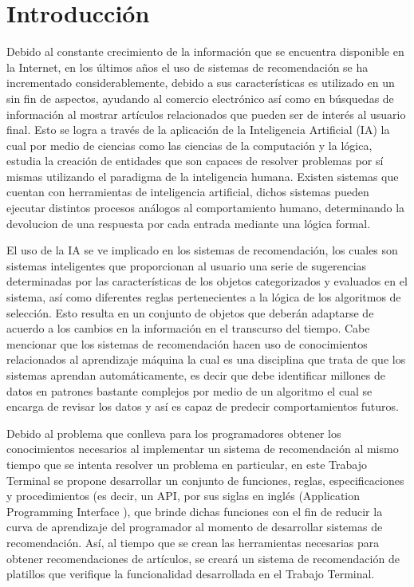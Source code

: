 \chapter{Introducción}
	Debido al constante crecimiento de la información que se encuentra disponible en la Internet, en los últimos años el uso de sistemas de recomendación se ha incrementado considerablemente, debido a sus características es utilizado en un sin fin de aspectos, ayudando al comercio electrónico así como en búsquedas de información al mostrar artículos relacionados que pueden ser de interés al usuario final. Esto se logra a través de la aplicación de la Inteligencia Artificial (IA) la cual por medio de ciencias como las ciencias de la computación y la lógica, estudia la creación de entidades que son capaces de resolver problemas por sí mismas utilizando el paradigma de la inteligencia humana. Existen sistemas que cuentan con herramientas de inteligencia artificial, dichos sistemas pueden ejecutar distintos procesos análogos al comportamiento humano, determinando la devolucion de una respuesta por cada entrada mediante una lógica formal. \cite{1}

	El uso de la IA se ve implicado en los sistemas de recomendación, los cuales son sistemas inteligentes que proporcionan al usuario una serie de sugerencias determinadas por las características de los objetos categorizados y evaluados en el sistema, así como diferentes reglas pertenecientes a la lógica de los algoritmos de selección. Esto resulta en un conjunto de objetos que deberán adaptarse de acuerdo a los cambios en la información en el transcurso del tiempo. Cabe mencionar que los sistemas de recomendación hacen uso de conocimientos relacionados al aprendizaje máquina la cual es una disciplina que trata de que los sistemas aprendan automáticamente, es decir que debe identificar millones de datos en patrones bastante complejos por medio de un algoritmo el cual se encarga de revisar los datos y así es capaz de predecir comportamientos futuros. \cite{2}

	Debido al problema que conlleva para los programadores obtener los conocimientos necesarios al implementar un sistema de recomendación al mismo tiempo que se intenta resolver un problema en particular, en este Trabajo Terminal se propone desarrollar un conjunto de funciones, reglas, especificaciones y procedimientos (es decir, un API, por sus siglas en inglés (Application Programming Interface ), que brinde dichas funciones con el fin de reducir la curva de aprendizaje del programador al momento de desarrollar sistemas de recomendación. \cite{3} Así, al tiempo que se crean las herramientas necesarias para obtener recomendaciones de artículos, se creará un sistema de recomendación de platillos que verifique la funcionalidad desarrollada en el Trabajo Terminal. 